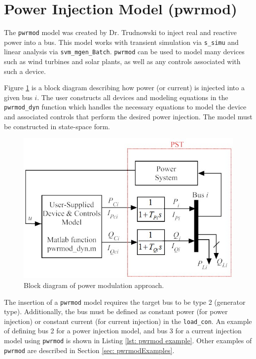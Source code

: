 \section{Power Injection Model (pwrmod)}  

The \verb|pwrmod| model was created by Dr. Trudnowski  to inject real and reactive power into a bus.
This model works with transient simulation via \verb|s_simu| and linear analysis via \verb|svm_mgen_Batch|.
\verb|pwrmod| can be used to model many devices such as wind turbines and solar plants, as well as any controls associated with such a device.

Figure \ref{fig: pwrmod BD} is a block diagram describing how power (or current) is injected into a given bus $i$.
The user constructs all devices and modeling equations in the \verb|pwrmod_dyn| function which handles the necessary equations to model the device and associated controls that perform the desired power injection.
The model must be constructed in state-space form.

\begin{figure}[H]
	\centering
	\footnotesize
	\includegraphics[width=.75\linewidth]{sections/pwrmod/BlockDiagram1}
	\caption{Block diagram of power modulation approach.}
	\label{fig: pwrmod BD}
\end{figure}%

The insertion of a \verb|pwrmod| model requires the target bus to be type 2 (generator type).
Additionally, the bus must be defined as constant power (for power injection) or constant current (for current injection) in the \verb|load_con|.
An example of defining bus 2 for a power injection model, and bus 3 for a current injection model using \verb|pwrmod| is shown in Listing \ref{lst: pwrmod example}.
Other examples of \verb|pwrmod| are described in Section \ref{sec: pwrmodExamples}.


